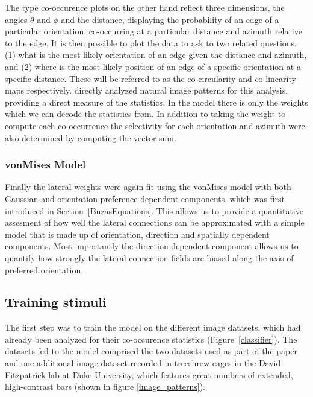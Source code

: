 The \cite{Geisler2001} type co-occurence plots on the other hand
reflect three dimensions, the angles $\theta$ and $\phi$ and the
distance, displaying the probability of an edge of a particular
orientation, co-occurring at a particular distance and azimuth
relative to the edge. It is then possible to plot the data to ask to
two related questions, (1) what is the most likely orientation of an
edge given the distance and azimuth, and (2) where is the most likely
position of an edge of a specific orientation at a specific
distance. These will be referred to as the co-circularity and
co-linearity maps respectively. \citep{Geisler2001} directly analyzed
natural image patterns for this analysis, providing a direct measure
of the statistics. In the model there is only the weights which we can
decode the statistics from. In addition to taking the weight to
compute each co-occurrence the selectivity for each orientation and
azimuth were also determined by computing the vector sum.

\subsubsection{vonMises Model}

Finally the lateral weights were again fit using the vonMises model
with both Gaussian and orientation preference dependent components,
which was first introduced in Section~\ref{BuzasEquations}. This
allows us to provide a quantitative assesment of how well the lateral
connections can be approximated with a simple model that is made up of
orientation, direction and spatially dependent components. Most
importantly the direction dependent component allows us to quantify
how strongly the lateral connection fields are biased along the axis
of preferred orientation.

\subsection{Training stimuli}

The first step was to train the model on the different image datasets,
which had already been analyzed for their co-occurence statistics
(Figure~\ref{classifier}). The datasets fed to the model comprised the
two datasets used as part of the paper and one additional image
dataset recorded in treeshrew cages in the David Fitzpatrick lab at
Duke University, which features great numbers of extended,
high-contrast bars (shown in figure \ref{image_patterns}).

